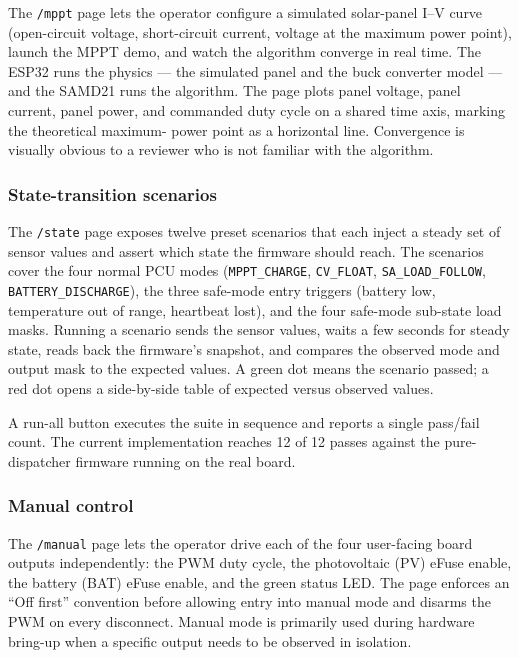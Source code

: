 The \texttt{/mppt} page lets the operator configure a simulated
solar-panel I--V curve (open-circuit voltage, short-circuit
current, voltage at the maximum power point), launch the MPPT
demo, and watch the algorithm converge in real time. The ESP32
runs the physics --- the simulated panel and the buck converter
model --- and the SAMD21 runs the algorithm. The page plots
panel voltage, panel current, panel power, and commanded duty
cycle on a shared time axis, marking the theoretical maximum-
power point as a horizontal line. Convergence is visually
obvious to a reviewer who is not familiar with the algorithm.

\subsubsection{State-transition scenarios}

The \texttt{/state} page exposes twelve preset scenarios that
each inject a steady set of sensor values and assert which
state the firmware should reach. The scenarios cover the four
normal PCU modes (\texttt{MPPT\_CHARGE},
\texttt{CV\_FLOAT}, \texttt{SA\_LOAD\_FOLLOW},
\texttt{BATTERY\_DISCHARGE}), the three safe-mode entry triggers
(battery low, temperature out of range, heartbeat lost), and the
four safe-mode sub-state load masks. Running a scenario sends
the sensor values, waits a few seconds for steady state, reads
back the firmware's snapshot, and compares the observed mode and
output mask to the expected values. A green dot means the
scenario passed; a red dot opens a side-by-side table of
expected versus observed values.

A run-all button executes the suite in sequence and reports a
single pass/fail count. The current implementation reaches
12 of 12 passes against the pure-dispatcher firmware running on
the real board.

\subsubsection{Manual control}

The \texttt{/manual} page lets the operator drive each of the
four user-facing board outputs independently: the PWM duty
cycle, the photovoltaic (PV) eFuse enable, the battery (BAT)
eFuse enable, and the green status LED. The page enforces an
``Off first'' convention before allowing entry into manual
mode and disarms the PWM on every disconnect. Manual mode is
primarily used during hardware bring-up when a specific output
needs to be observed in isolation.

